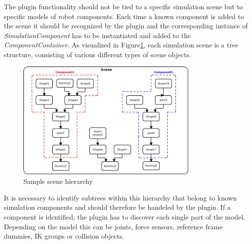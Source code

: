 The plugin functionality should not be tied to a specific simulation scene but to specific models of robot components. Each time a known component is added to the scene it should be recognized by the plugin and the corresponding instance of \emph{SimulationComponent} has to be instantiated and added to the \emph{ComponentContainer}. As visualized in Figure\ref{fig:scene_tree}, each simulation scene
is a tree structure, consisting of various different types of scene objects. 
\begin{figure}[h]
	\centering
  	\includegraphics[width=0.8\textwidth]{images/scene_hierarchy.jpg}
	\caption{Sample scene hierarchy}
	\label{fig:scene_tree}
\end{figure}
It is necessary to identify subtrees within this hierarchy that belong to known simulation components and should therefore be handeled by the plugin. If a component is identified, the plugin has to discover each single part of the model. Depending on the model this can be joints, force sensors, reference frame dummies, IK groups or collision objects.

